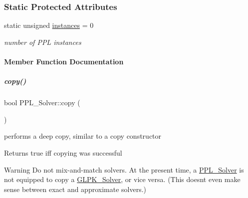 \subsubsection*{Static Protected Attributes}
\begin{DoxyCompactItemize}
\item 
\mbox{\label{group___c_l_s_solvers_a346402cddefaa715291dfb7f243073a2}} 
static unsigned \hyperlink{group___c_l_s_solvers_a346402cddefaa715291dfb7f243073a2}{instances} = 0
\begin{DoxyCompactList}\small\item\em number of P\+PL instances \end{DoxyCompactList}\end{DoxyCompactItemize}


\paragraph{Member Function Documentation}
\mbox{\label{group___c_l_s_solvers_a67408174d2260de5ae5f070a70f27e9d}} 
\subparagraph{\texorpdfstring{copy()}{copy()}}
{\footnotesize\ttfamily bool P\+P\+L\+\_\+\+Solver\+::copy (\begin{DoxyParamCaption}\item[{const \hyperlink{group___c_l_s_solvers_class_l_p___solver}{L\+P\+\_\+\+Solver} $\ast$}]{ }\end{DoxyParamCaption})\hspace{0.3cm}{\ttfamily [virtual]}}



performs a deep copy, similar to a copy constructor 

\begin{DoxyReturn}{Returns}
{\ttfamily true} iff copying was successful 
\end{DoxyReturn}
\begin{DoxyWarning}{Warning}
Do not mix-\/and-\/match solvers. At the present time, a \hyperlink{group___c_l_s_solvers_class_p_p_l___solver}{P\+P\+L\+\_\+\+Solver} is not equipped to copy a \hyperlink{group___c_l_s_solvers_class_g_l_p_k___solver}{G\+L\+P\+K\+\_\+\+Solver}, or vice versa. (This doesn\textquotesingle{}t even make sense between exact and approximate solvers.) 
\end{DoxyWarning}



